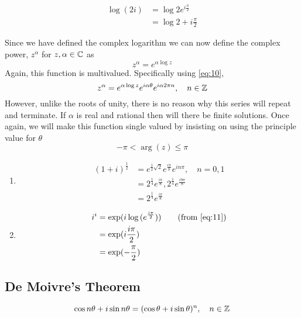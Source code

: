 \documentclass{article}
\numberwithin{equation}{section}
\begin{document}
\begin{eg}
    \begin{align*}
        \log{(2i)} &= \log{2e^{i\frac{\pi}{2}}} \\
        &=\log{2} + i\frac{\pi}{2}
    \end{align*}
\end{eg}

\begin{defi}
    Since we have defined the complex logarithm we can now define the complex power, $z^\alpha$ for $z, \alpha \in \mathbb{C}$ as
    \begin{equation}
        z^\alpha = e^{\alpha \log{z}} \label{eq:11}
    \end{equation}
    Again, this function is multivalued. Specifically using \eqref{eq:10},
    \[
        z^\alpha = e^{\alpha \log{z}}e^{i \alpha \theta}e^{i \alpha 2\pi n}, \quad n \in \mathbb{Z}
    \]
    However, unlike the roots of unity, there is no reason why this series will repeat and terminate. If $\alpha$ is real and rational then will there be finite solutions. Once again, we will make this function single valued by insisting on using the principle value for $\theta$
    \[
        -\pi < \arg{(z)} \leq \pi
    \]
\end{defi}

\begin{ex}\leavevmode
    \begin{enumerate}
        \item \begin{align*}
            (1 + i)^\frac{1}{2} &= e^{\frac{1}{2}\sqrt{2}}e^\frac{i\pi}{8}e^{in\pi}, \quad n = 0, 1 \\
            &= 2^\frac{1}{4}e^\frac{i\pi}{8}, 2^\frac{1}{4}e^\frac{i9\pi}{8} \\
            &= 2^\frac{1}{4}e^\frac{i\pi}{8} \tag{by insiting on the principle value}
        \end{align*}
        \item \begin{align*}
            i^i &= \exp(i \log{(e^\frac{i\pi}{2})}) \tag{from \eqref{eq:11}} \\
            &= \exp(i \frac{i\pi}{2}) \\
            &= \exp(-\frac{\pi}{2})
        \end{align*}
    \end{enumerate}
\end{ex}

\subsection{De Moivre's Theorem}
\begin{thm}
    \begin{equation}
        \cos{n\theta} + i\sin{n\theta} = (\cos{\theta} + i\sin{\theta})^n, \quad n \in \mathbb{Z} \label{eq:12}
    \end{equation}
\end{thm}
\end{document}
